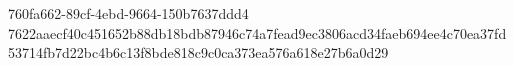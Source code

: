 760fa662-89cf-4ebd-9664-150b7637ddd4
7622aaecf40c451652b88db18bdb87946c74a7fead9ec3806acd34faeb694ee4c70ea37fd53714fb7d22bc4b6c13f8bde818c9c0ca373ea576a618e27b6a0d29
